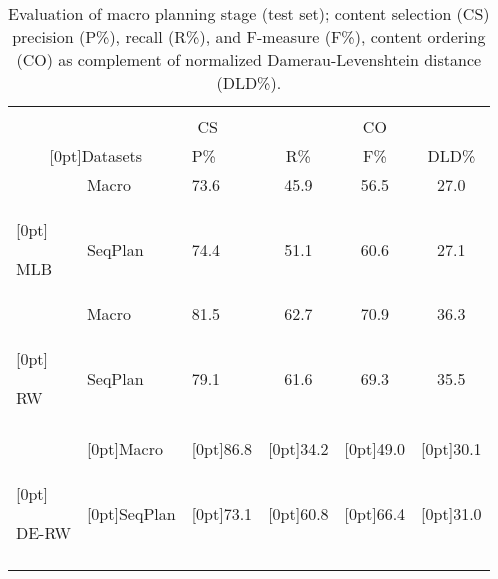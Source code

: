 \begin{table}[t]
\footnotesize
\centering
\begin{tabular}{ll|lcc|c} 
\multicolumn{5}{c}{} \\ \thickhline
 \multicolumn{2}{c}{}  &\multicolumn{3}{c}{CS} & CO \\ 
 \multicolumn{2}{c|}{\raisebox{.4ex}[0pt]{Datasets}} &  P\% & R\% & F\% & DLD\% \\ \thickhline
&Macro & 73.6 & 45.9 & 56.5 & 27.0 \\
\raisebox{-0.5ex}[0pt]{\begin{sideways}MLB~~\end{sideways}} &SeqPlan & 74.4 & 51.1 & 60.6 & 27.1 \\\hline\hline
&Macro & 81.5 & 62.7 & 70.9 & 36.3 \\  \raisebox{.1ex}[0pt]{\begin{sideways}RW\end{sideways}}&SeqPlan & 79.1
& 61.6 & 69.3& 35.5 \\\hline \hline
 & & & & & \\
&\raisebox{2ex}[0pt]{Macro} & \raisebox{2ex}[0pt]{86.8} & \raisebox{2ex}[0pt]{34.2} & \raisebox{2ex}[0pt]{49.0} & \raisebox{2ex}[0pt]{30.1} \\
\raisebox{.02ex}[0pt]{\begin{sideways}DE-RW\end{sideways}} &\raisebox{1.5ex}[0pt]{SeqPlan} & \raisebox{1.5ex}[0pt]{73.1} & \raisebox{1.5ex}[0pt]{60.8} & \raisebox{1.5ex}[0pt]{66.4} & \raisebox{1.5ex}[0pt]{31.0} \\
\thickhline 
\end{tabular}
\caption{Evaluation of macro planning stage (test set); 
content selection (CS) precision (P\%), recall (R\%), and F-measure
(F\%), content ordering (CO) as  complement of normalized
Damerau-Levenshtein distance (DLD\%).}
\label{tbl:inf-plans-cs-co-rw}
\end{table}




